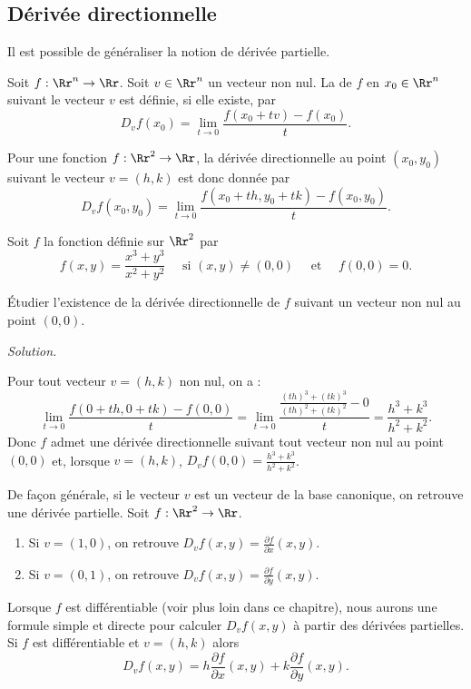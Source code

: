 \documentclass[11pt, class=report,crop=false]{standalone}
\begin{document}
\subsection{Dérivée directionnelle}

Il est possible de généraliser la notion de dérivée partielle.
\begin{definition}
Soit $f : \Rr^n \to \Rr$.
Soit $v \in \Rr^n$ un vecteur non nul. La  de $f$ 
en $x_0 \in \Rr^n$ suivant le vecteur $v$ est définie, si elle existe, par
$$D_{v}f(x_0)= \lim_{t\to 0} \frac{f(x_0 + t v)-f(x_0)}{t}.$$
\end{definition}


Pour une fonction $f : \Rr^2 \to \Rr$, la dérivée directionnelle au point $(x_0,y_0)$ suivant le vecteur $v=(h,k)$ est donc donnée par 
$$D_{v}f(x_0,y_0)= \lim_{t\to 0} \frac{f(x_0 + t h,y_0+tk)-f(x_0,y_0)}{t}.$$


\begin{exemple}
Soit $f$ la fonction définie sur $\Rr^2$ par
$$f(x,y)=\frac{x^3+y^3}{x^2+y^2} \quad \text{ si }(x,y)\neq (0,0)\quad \text{ et }\quad f(0,0)= 0.$$

\'Etudier l'existence de la dérivée directionnelle de $f$ suivant un vecteur non nul au point $(0,0)$.


\bigskip
\emph{Solution.}

Pour tout vecteur $v=(h,k)$ non nul, on a :
$$\lim _{t\to 0} \frac{f(0+th,0+tk)-f(0,0)}{t}=
\lim _{t\to 0} \frac{\frac{(th)^3+(tk)^3}{(th)^2+(tk)^2} - 0}{t} =
\frac{h^3+k^3}{h^2+k^2}.$$
Donc $f$ admet une dérivée directionnelle suivant tout vecteur non nul au point $(0,0)$
et, lorsque $v=(h,k)$,  $D_v f (0,0) = \frac{h^3+k^3}{h^2+k^2}$.
\end{exemple}


\bigskip

De façon générale, si le vecteur $v$ est un vecteur de la base canonique, on retrouve une dérivée partielle. Soit $f : \Rr^2 \to \Rr$.
\begin{enumerate}
\item Si $v=(1,0)$, on retrouve $D_{v}f(x,y) = \frac{\partial f}{\partial x}(x,y)$.
\item Si $v=(0,1)$, on retrouve $D_{v}f(x,y) = \frac{\partial f}{\partial y}(x,y)$.
\end{enumerate}

Lorsque $f$ est différentiable (voir plus loin dans ce chapitre), nous aurons une formule simple et directe pour calculer $D_vf(x,y)$ à partir des dérivées partielles.
Si $f$ est différentiable et $v=(h,k)$ alors
$$D_vf(x,y) = h \frac{\partial f}{\partial x}(x,y) + k \frac{\partial f}{\partial y}(x,y).$$
 
\end{document}
